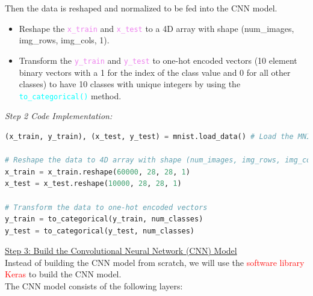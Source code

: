 \documentclass{book}
\begin{document}
Then the data is reshaped and normalized to be fed into the CNN model.
\begin{itemize}
    \item Reshape the \textcolor{violet}{\texttt{x\_train}} and \textcolor{violet}{\texttt{x\_test}} to a 4D array with shape (num\_images, img\_rows, img\_cols, 1).
    \item Transform the \textcolor{violet}{\texttt{y\_train}} and \textcolor{violet}{\texttt{y\_test}} to one-hot encoded vectors (10 element binary vectors with a 1 for the index of the class value and 0 for all other classes) to have 10 classes with unique integers by using the \textcolor{cyan}{\texttt{to\_categorical()}} method.
\end{itemize}
\vspace{1mm}
\textit{\large Step 2 Code Implementation:}\\
\begin{lstlisting}[language=Python, basicstyle=\ttfamily\small, keywordstyle=\color{blue}, commentstyle=\color{forestgreen}, stringstyle=\color{red}, showstringspaces=false]
(x_train, y_train), (x_test, y_test) = mnist.load_data() # Load the MNIST dataset

# Reshape the data to 4D array with shape (num_images, img_rows, img_cols, 1)
x_train = x_train.reshape(60000, 28, 28, 1)
x_test = x_test.reshape(10000, 28, 28, 1)

# Transform the data to one-hot encoded vectors
y_train = to_categorical(y_train, num_classes)
y_test = to_categorical(y_test, num_classes)
\end{lstlisting}
\uline{Step 3: Build the Convolutional Neural Network (CNN) Model}\\
\vspace{1mm}
Instead of building the CNN model from scratch, we will use the \textcolor{red}{software library Keras} to build the CNN model.\\
The CNN model consists of the following layers:
\end{document}
